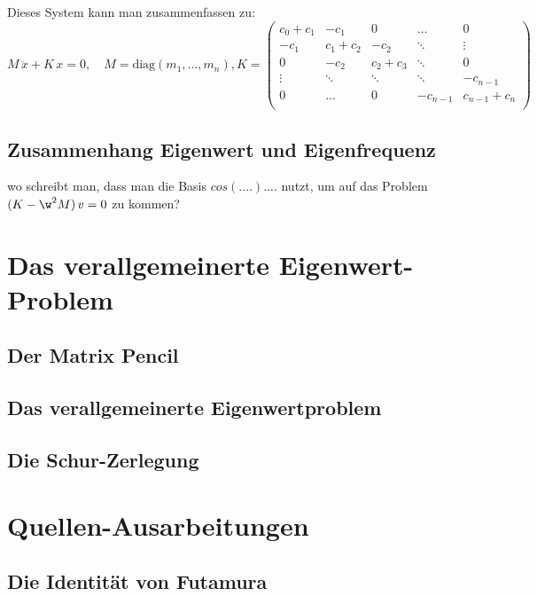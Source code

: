 \documentclass[ngerman,BCOR=4mm]{tudscrreprt}
\theoremstyle{plain} %
\theoremstyle{definition} %
\theoremstyle{remark}
\begin{document}
            Dieses System kann man zusammenfassen zu:
            $$M\,\ddot x + K\,x = 0,\quad M= \text{diag}(m_1,\dots,m_n),
            K = \begin{pmatrix}
                  c_0+c_1 & -c_1 &  0& ... & 0 \\
                  -c_1 & c_1+c_2 & -c_2 & \ddots & \vdots \\
                   0& -c_2 & c_2+c_3 & \ddots & 0 \\
                   \vdots & \ddots & \ddots & \ddots  & -c_{n-1} \\
                   0& ... & 0& -c_{n-1} & c_{n-1}+c_n \\
                  \end{pmatrix}$$
                  
      \section{Zusammenhang Eigenwert und Eigenfrequenz}

            wo schreibt man, dass man die Basis $cos(....)....$ nutzt, um auf das Problem $(K-\w^2 M)\, v = 0$ zu kommen?


\chapter{Das verallgemeinerte Eigenwert-Problem}
\label{sec: EW Problem}
      \section{Der Matrix Pencil}

      \section{Das verallgemeinerte Eigenwertproblem}

      \section{Die Schur-Zerlegung}

\chapter{Quellen-Ausarbeitungen}
\label{sec: Quellen}
      \section{Die Identität von Futamura}
\end{document}
